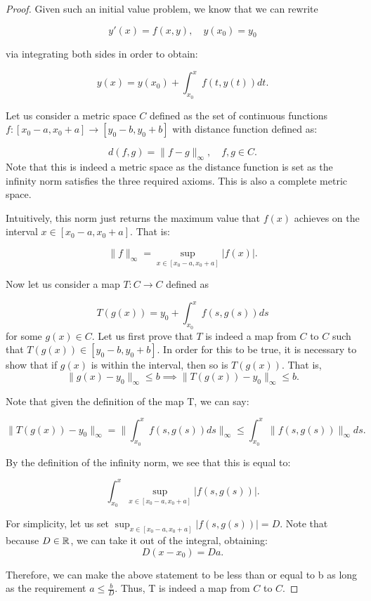 \documentclass{article}
\theoremstyle{remark}
\begin{document}
\begin{proof}

Given such an initial value problem, we know that we can rewrite

$$y'(x) = f(x,y), \quad y(x_0) = y_0$$

via integrating both sides in order to obtain:

$$ y(x) = y(x_0) + \int_{x_0}^{x}f(t,y(t))dt.$$


Let us consider a metric space $C$ defined as the set of continuous functions $f: [x_0 -a, x_0+a] \to [y_0 -b, y_0 +b]$ with distance function defined as:

$$d(f,g) = \|f-g\|_{\infty},\quad f,g \in C.$$
Note that this is indeed a metric space as the distance function is set as the infinity norm satisfies the three required axioms. This is also a complete metric space. 



Intuitively, this norm just returns the maximum value that $f(x)$ achieves on the interval $x\in [x_0 -a, x_0+a]$. That is:


$$\|f\|_{\infty} = \sup_{x\in [x_0 -a, x_0+a]} |f(x)|.$$

Now let us consider a map $T: C \to C$ defined as 

$$T( g(x)) = y_0 + \int_{x_0}^xf(s, g(s))ds$$
for some $g(x) \in C$. Let us first prove that $T$ is indeed a map from $C$ to $C$ such that $T(g(x)) \in [y_0 -b, y_0 +b]$. In order for this to be true, it is necessary to show that if $g(x)$ is within the interval, then so is $T(g(x))$. That is, 
$$\| g(x) - y_0\|_{\infty} \leq b \implies \|T(g(x))-y_0\|_\infty \leq b.$$

Note that given the definition of the map T, we can say:

$$\|T(g(x))-y_0\|_\infty = \|\int_{x_0}^xf(s, g(s))ds\|_{\infty} \leq \int_{x_0}^x \|f(s, g(s))\|_\infty ds.$$

By the definition of the infinity norm, we see that this is equal to:

$$ \int_{x_0}^{x}\sup_{x \in [x_0 -a, x_0 +a]}|f(s,g(s))| .$$

For simplicity, let us set $\sup_{x \in [x_0 -a, x_0 +a]}|f(s,g(s))| = D$. Note that because $D \in \Bbb R$, we can take it out of the integral, obtaining:
$$D(x-x_0) = Da.$$

Therefore, we can make the above statement to be less than or equal to b as long as the requirement $a \leq \frac{b}{D}$. Thus, T is indeed a map from $C$ to $C$.


\end{proof}
\end{document}
